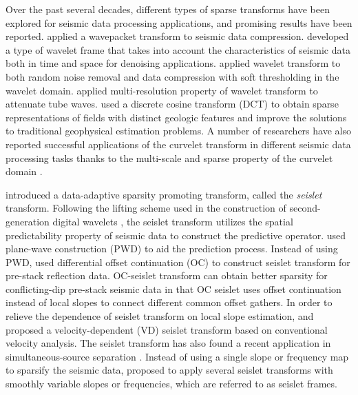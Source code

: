 Over the past several decades, different types of sparse transforms have been explored for seismic data processing applications, and promising results have been reported. \cite{luoyi1992} applied a wavepacket transform to seismic data compression. \cite{zhangr2003} developed a type of wavelet frame that takes into account the characteristics of seismic data both in time and space for denoising applications. \cite{ioup1998} applied wavelet transform to both random noise removal and data compression with soft thresholding in the wavelet domain. \cite{du2000} applied multi-resolution property of wavelet transform to attenuate tube waves. \cite{jafarpour2009} used a discrete cosine transform (DCT) to obtain sparse representations of fields with distinct geologic features and improve the solutions to traditional geophysical estimation problems. A number of researchers have also reported successful applications of the curvelet transform \cite[]{candes20061} in different seismic data processing tasks thanks to the multi-scale and sparse property of the curvelet domain \cite[]{hennenfent2006,deli2008}. %

\cite{fomel2010seislet} introduced a data-adaptive sparsity promoting transform, called the \emph{seislet} transform. Following the lifting scheme used in the construction of second-generation digital wavelets \cite[]{sweldens1995}, the seislet transform utilizes the spatial predictability property of seismic data to construct the predictive operator. \cite{fomel2010seislet} used plane-wave construction (PWD) to aid the prediction process. Instead of using PWD, \cite{liuyang2010} used differential offset continuation (OC) to construct seislet transform for pre-stack reflection data. OC-seislet transform can obtain better sparsity for conflicting-dip pre-stack seismic data in that OC seislet uses offset continuation \cite[]{fomel2003} instead of local slopes to connect different common offset gathers. %
In order to relieve the dependence of seislet transform on local slope estimation, \cite{liuyang2013} and \cite{liuyang2015} proposed a velocity-dependent (VD) seislet transform based on conventional velocity analysis. The seislet transform has also found a recent application in simultaneous-source separation \cite[]{yangkang20142}. Instead of using a single slope or frequency map to sparsify the seismic data, \cite{fomel2010seislet} proposed to apply several seislet transforms with smoothly variable slopes or frequencies, which are referred to as seislet frames.

